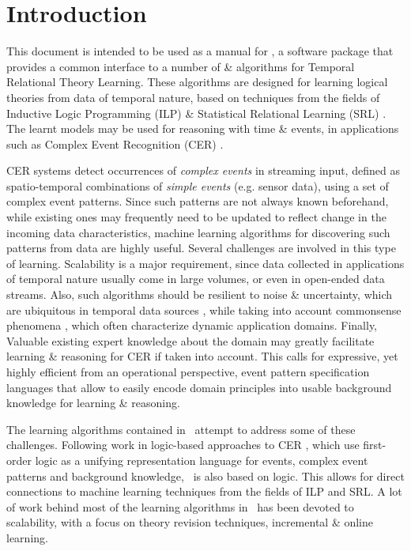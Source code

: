 \section{Introduction}
\label{sec:intro}

This document is intended to be used as a manual for \trail, a software package that provides a common interface to a number of \& algorithms for Temporal Relational Theory Learning. These algorithms are designed for learning logical theories from data of temporal nature, based on techniques from the fields of Inductive Logic Programming (ILP) \cite{de2008logical} \& Statistical Relational Learning (SRL) \cite{raedt2016statistical}. The learnt models may be used for reasoning with time \& events, in applications such as Complex Event Recognition (CER) \cite{cugola2012processing}. 

CER systems detect occurrences of \emph{complex events} in streaming input, defined as spatio-temporal combinations of \emph{simple events} (e.g. sensor data), using a set of complex event patterns. Since such patterns are not always known beforehand, while existing ones may frequently need to be updated to reflect change in the incoming data characteristics, machine learning algorithms for discovering such patterns from data are highly useful. Several challenges are involved in this type of learning. Scalability is a major requirement, since data collected in applications of temporal nature usually come in large volumes, or even in open-ended data streams. Also, such algorithms should be resilient to noise \& uncertainty, which are ubiquitous in temporal data sources \cite{DBLP:journals/corr/AlevizosSAP17}, while taking into account commonsense phenomena \cite{mueller2014commonsense}, which often characterize dynamic application domains. Finally, Valuable existing expert knowledge about the domain may greatly facilitate learning \& reasoning for CER if taken into account. This calls for expressive, yet highly efficient from an operational perspective, event pattern specification languages that allow to easily encode domain principles into usable background knowledge for learning \& reasoning. 

The learning algorithms contained in \trail \ attempt to address some of these challenges. Following work in logic-based approaches to CER \cite{artikis2012logic,artikis2015event}, which use first-order logic as a unifying representation language for events, complex event patterns and background knowledge, \trail \ is also based on logic. This allows for direct connections to machine learning techniques from the fields of ILP and SRL. A lot of work behind most of the learning algorithms in \trail \ has been devoted to scalability, with a focus on theory revision techniques, incremental \& online learning.\\

